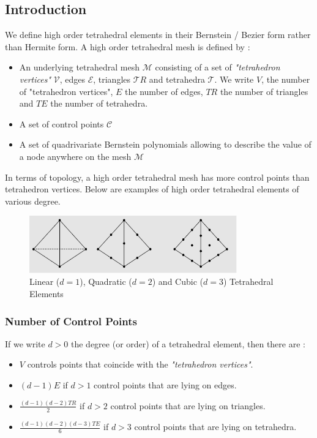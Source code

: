 \documentclass[a4paper,11pt]{article}
\newcommand{\vertices}{{\mathcal V}}
\newcommand{\edges}{{\mathcal E}}
\newcommand{\tetrahedra}{{\mathcal T}}
\newcommand{\triangles}{{\mathcal TR}}
\newcommand{\mesh}{{\mathcal M}}
\newcommand{\controls}{{\mathcal C}}
\newcommand{\nvertices}{{ V}}
\newcommand{\nedges}{{ E}}
\newcommand{\ntriangles}{{ TR}}
\newcommand{\ntetrahedra}{{ TE}}
\newcommand{\degree}{{d}}
\begin{document}
\subsection{Introduction}

We define high order tetrahedral elements in their Bernstein / Bezier form rather than Hermite form. 
A high order tetrahedral mesh is defined by :

\begin{itemize}
	\item An underlying tetrahedral mesh $\mesh$ consisting of a set of {\em "tetrahedron vertices"} $\vertices$, edges $\edges$, triangles $\triangles$ and tetrahedra $\tetrahedra$. We write $\nvertices$, the number of "tetrahedron vertices", $\nedges$ the number of edges, $\ntriangles$ the number of triangles and $\ntetrahedra$ the number of tetrahedra. 
	\item A set of control points $\controls$
	\item A set of quadrivariate Bernstein polynomials  allowing to describe the value of a node anywhere on the mesh $\mesh$ 
\end{itemize}
%

In terms of topology, a high order tetrahedral mesh has more control points than tetrahedron vertices.
Below are examples of high order tetrahedral elements of various degree.
\begin{figure}[!htbp]
	\centering
    \includegraphics[width=0.80\textwidth]{HighOrderTetra}
	\caption{Linear ($\degree=1$), Quadratic ($\degree=2$) and Cubic ($\degree=3$) Tetrahedral Elements}
	\label{fig:LinearQuadraticAndCubicTetrahedralElements}
\end{figure}


\subsubsection{Number of Control Points}

If we write $\degree>0$ the degree (or order) of a tetrahedral element, then there are :

\begin{itemize}
	\item $\nvertices$ controls points that coincide with the {\em "tetrahedron vertices"}.
	\item $(\degree-1) \nedges$ if $\degree>1$ control points that are lying on edges. 
	\item $\frac{(\degree-1) (\degree-2) \ntriangles}{2}$ if $\degree>2$ control points that are lying on triangles. 
	\item $\frac{(\degree-1) (\degree-2) (\degree-3) \ntetrahedra}{6}$ if $\degree>3$ control points that are lying on tetrahedra. 
\end{itemize}
\end{document}
